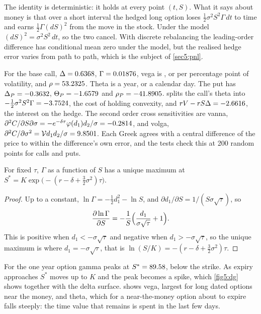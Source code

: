 \begin{chapterrefs}
The identity is deterministic: it holds at every point $(t,S)$. What it says about money is that over
a short interval the hedged long option loses $\tfrac12\sigma^2S^2\Gamma\,dt$ to time and earns
$\tfrac12\Gamma(dS)^2$ from the move in the stock. Under the model $(dS)^2=\sigma^2S^2\,dt$, so the
two cancel. With discrete rebalancing the leading-order difference has conditional mean zero under
the model, but the realised hedge error varies from path to path, which is the subject of
\cref{sec5:pnl}.

For the base call, $\Delta=0.6368$, $\Gamma=0.01876$, vega is \vegaB, or \vegaPoint{} per percentage
point of volatility, and $\rho=53.2325$. Theta is \thetaC{} a year, or \thetaCDay{} a calendar day. The
put has $\Delta_P=-0.3632$, $\Theta_P=-1.6579$ and $\rho_P=-41.8905$.  splits the
call's theta into $-\tfrac12\sigma^2S^2\Gamma=-3.7524$, the cost of holding convexity, and
$rV-rS\Delta=-2.6616$, the interest on the hedge. The second order cross sensitivities are
vanna, $\partial^2C/\partial S\partial\sigma=-e^{-\delta\tau}\varphi(d_1)d_2/\sigma=-0.2814$, and volga,
$\partial^2C/\partial\sigma^2=\mathcal Vd_1d_2/\sigma=9.8501$. Each Greek agrees with a central
difference of the price to within the difference's own error, and the tests check this at 200 random
points for calls and puts.

\begin{proposition}\label{prop5:gammapeak}
For fixed $\tau$, $\Gamma$ as a function of $S$ has a unique maximum at
$S^*=K\exp\bigl(-(r-\delta+\tfrac32\sigma^2)\tau\bigr)$.
\end{proposition}

\begin{proof}
Up to a constant, $\ln\Gamma=-\tfrac12d_1^2-\ln S$, and $\partial d_1/\partial S=1/(S\sigma\sqrt\tau)$,
so
\begin{equation*}
  \frac{\partial\ln\Gamma}{\partial S}=-\frac1S\Bigl(\frac{d_1}{\sigma\sqrt\tau}+1\Bigr).
\end{equation*}
This is positive when
$d_1<-\sigma\sqrt\tau$ and negative when $d_1>-\sigma\sqrt\tau$, so the unique maximum is where
$d_1=-\sigma\sqrt\tau$, that is $\ln(S/K)=-(r-\delta+\tfrac32\sigma^2)\tau$.
\end{proof}

For the one year option gamma peaks at $S^*=89.58$, below the strike. As expiry approaches $S^*$
moves up to $K$ and the peak becomes a spike, which \cref{fig5:dg} shows together with the delta
surface.  shows vega, largest for long dated options near the money, and theta, which
for a near-the-money option about to expire falls steeply: the time value that remains is spent in the
last few days.


\end{chapterrefs}

